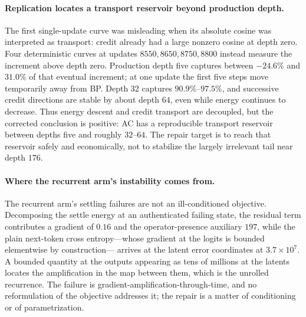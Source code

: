\documentclass[11pt]{article}
\begin{document}
\paragraph{Replication locates a transport reservoir beyond production depth.}
The first single-update curve was misleading when its absolute cosine was interpreted as
transport: credit already had a large nonzero cosine at depth zero. Four deterministic
curves at updates $8550,8650,8750,8800$ instead measure the increment above depth zero.
Production depth five captures between $-24.6\%$ and $31.0\%$ of that eventual
increment; at one update the first five steps move temporarily away from BP. Depth $32$
captures $90.9\%$--$97.5\%$, and successive credit directions are stable by about depth
$64$, even while energy continues to decrease. Thus energy descent and credit transport
are decoupled, but the corrected conclusion is positive: AC has a reproducible transport
reservoir between depths five and roughly $32$--$64$. The repair target is to reach that
reservoir safely and economically, not to stabilize the largely irrelevant tail near
depth $176$.

\paragraph{Where the recurrent arm's instability comes from.}
The recurrent arm's settling failures are not an ill-conditioned objective. Decomposing
the settle energy at an authenticated failing state, the residual term contributes a
gradient of $0.16$ and the operator-presence auxiliary $197$, while the plain next-token
cross entropy---whose gradient at the logits is bounded elementwise by construction---
arrives at the latent error coordinates at $3.7\times10^{7}$. A bounded quantity at the
outputs appearing as tens of millions at the latents locates the amplification in the
map between them, which is the unrolled recurrence. The failure is
gradient-amplification-through-time, and no reformulation of the objective addresses it;
the repair is a matter of conditioning or of parametrization.
\end{document}
